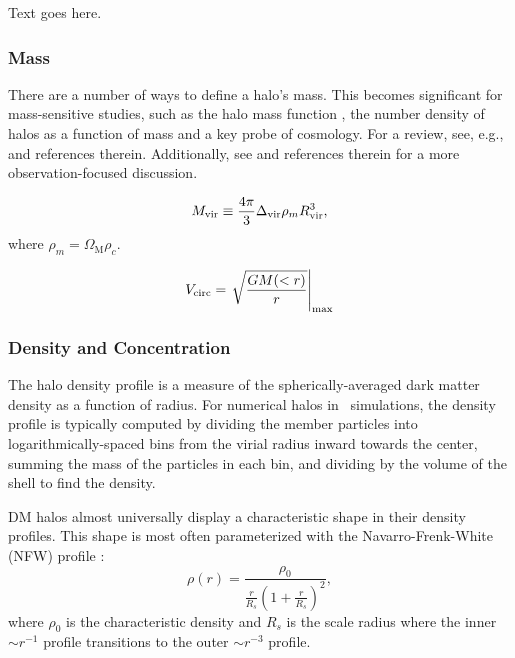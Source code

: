 Text goes here.



\subsubsection{Mass}
\label{subsubsec:early_universe--halo_properties--mass}


There are a number of ways to define a halo's mass.  This becomes significant for mass-sensitive studies, such as the halo mass function \citep{1974ApJ...187..425P, 2007MNRAS.374....2R, 2006ApJ...642L..85H, 2007ApJ...671.1160L}, the number density of halos as a function of mass and a key probe of cosmology.  For a review, see, e.g., \citet{2001A&A...367...27W} and references therein.  Additionally, see \citet{2005RvMP...77..207V} and references therein for a more observation-focused discussion.

\begin{equation}
	{M_{\mathrm{vir}}} \equiv \frac{4 \pi}{3} \Delta_{{\mathrm{vir}}} \rho_{m} R^{3}_{{\mathrm{vir}}},
\end{equation}
where $\rho_{m} = \Omega_{\mathrm{M}} \rho_{c}$.

\begin{equation}
	{V_{\mathrm{circ}}} = \left. \sqrt{\frac{GM(<r)}{r}} \right|_{\mathrm{\max}}
\end{equation}



\subsubsection{Density and Concentration}
\label{subsubsec:early_universe--halo_properties--density}


The halo density profile is a measure of the spherically-averaged dark matter density as a function of radius.  For numerical halos in \nbody\ simulations, the density profile is typically computed by dividing the member particles into logarithmically-spaced bins from the virial radius inward towards the center, summing the mass of the particles in each bin, and dividing by the volume of the shell to find the density.

DM halos almost universally display a characteristic shape in their density profiles.  This shape is most often parameterized with the Navarro-Frenk-White (NFW) profile \citep{1996ApJ...462..563N}:
\begin{equation} \label{eq:nfw_profile}
	\rho(r) = \frac{ \rho_{0} }{ \frac{ r }{ R_{s}} \left( 1 + \frac{r}{R_{s}} \right)^{2} },
\end{equation}
where $\rho_{0}$ is the characteristic density and $R_{s}$ is the scale radius where the inner $\sim r^{-1}$ profile transitions to the outer $\sim r^{-3}$ profile.

